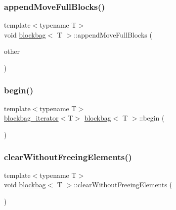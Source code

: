 \mbox{\label{classblockbag_a0c09852cf71019478f8d8d12579c514a}} 
\subsubsection{\texorpdfstring{append\+Move\+Full\+Blocks()}{appendMoveFullBlocks()}\hspace{0.1cm}{\footnotesize\ttfamily [2/2]}}
{\footnotesize\ttfamily template$<$typename T$>$ \\
void \hyperlink{classblockbag}{blockbag}$<$ T $>$\+::append\+Move\+Full\+Blocks (\begin{DoxyParamCaption}\item[{\hyperlink{classblockbag}{blockbag}$<$ T $>$ $\ast$const}]{other }\end{DoxyParamCaption})\hspace{0.3cm}{\ttfamily [inline]}}

\mbox{\label{classblockbag_a8f600e6e4330a864d36572a3adaf387e}} 
\subsubsection{\texorpdfstring{begin()}{begin()}}
{\footnotesize\ttfamily template$<$typename T$>$ \\
\hyperlink{classblockbag__iterator}{blockbag\+\_\+iterator}$<$T$>$ \hyperlink{classblockbag}{blockbag}$<$ T $>$\+::begin (\begin{DoxyParamCaption}{ }\end{DoxyParamCaption})\hspace{0.3cm}{\ttfamily [inline]}}

\mbox{\label{classblockbag_a2ed40017536b0d2882c8b5ca432a0ebc}} 
\subsubsection{\texorpdfstring{clear\+Without\+Freeing\+Elements()}{clearWithoutFreeingElements()}}
{\footnotesize\ttfamily template$<$typename T$>$ \\
void \hyperlink{classblockbag}{blockbag}$<$ T $>$\+::clear\+Without\+Freeing\+Elements (\begin{DoxyParamCaption}{ }\end{DoxyParamCaption})\hspace{0.3cm}{\ttfamily [inline]}}

